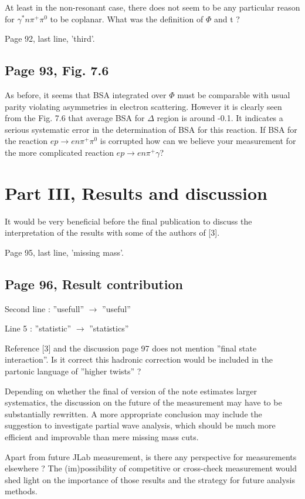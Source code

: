 \documentclass[11pt]{paper}
\begin{document}
At least in the non-resonant case, there does not seem to be any particular reason for $\gamma^*n\pi^+\pi^0$ to be coplanar.
What was the definition of $\Phi$ and t ?

Page 92, last line, 'third'.

\subsection*{Page 93, Fig. 7.6}
 
As before, it seems that BSA integrated over $\Phi$ must be comparable with usual parity violating asymmetries in electron scattering.
 However it is clearly seen from the Fig. 7.6 that average BSA for $\Delta$ region is around -0.1.
 It indicates a serious systematic error in the determination of BSA for this reaction.  If BSA for the
 reaction $ep\to en\pi^+\pi^0$ is corrupted how can we believe your measurement for the 
 more complicated reaction $ep\to en\pi^+\gamma$?
 
  
\section*{Part III, Results and discussion}

It would be very beneficial before the final publication to discuss the interpretation of the results with some of the authors of [3].

Page 95, last line, 'missing mass'.

\subsection*{Page 96, Result contribution}
 
Second line : ''usefull'' $\rightarrow$ ''useful''
 
Line 5 : ''statistic'' $\rightarrow$ ''statistics''
  
Reference [3] and the discussion page 97 does not mention ''final state interaction''.
Is it correct this hadronic correction would be included in the partonic language of ''higher twists'' ?

Depending on whether the final of version of the note estimates larger systematics, the discussion on the future of the measurement may have to be substantially rewritten.
A more appropriate conclusion may include the suggestion to investigate partial wave analysis, which should be much more efficient and improvable than mere missing mass cuts.

Apart from future JLab measurement, is there any perspective for measurements elsewhere ?
The (im)possibility of competitive or cross-check measurement would shed light on the importance of those results and the strategy for future analysis methods.
\end{document}
